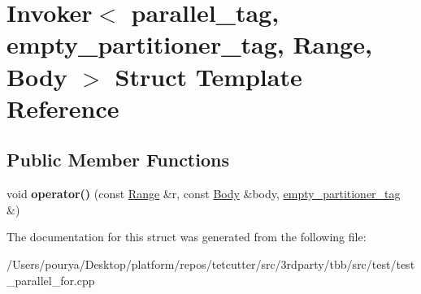 \hypertarget{structInvoker_3_01parallel__tag_00_01empty__partitioner__tag_00_01Range_00_01Body_01_4}{}\section{Invoker$<$ parallel\+\_\+tag, empty\+\_\+partitioner\+\_\+tag, Range, Body $>$ Struct Template Reference}
\label{structInvoker_3_01parallel__tag_00_01empty__partitioner__tag_00_01Range_00_01Body_01_4}
\subsection*{Public Member Functions}
\begin{DoxyCompactItemize}
\item 
\hypertarget{structInvoker_3_01parallel__tag_00_01empty__partitioner__tag_00_01Range_00_01Body_01_4_a876943ff4cbe8f4de0a47125411f743a}{}void {\bfseries operator()} (const \hyperlink{classtbb_1_1blocked__range}{Range} \&r, const \hyperlink{classBody}{Body} \&body, \hyperlink{structempty__partitioner__tag}{empty\+\_\+partitioner\+\_\+tag} \&)\label{structInvoker_3_01parallel__tag_00_01empty__partitioner__tag_00_01Range_00_01Body_01_4_a876943ff4cbe8f4de0a47125411f743a}

\end{DoxyCompactItemize}


The documentation for this struct was generated from the following file\+:\begin{DoxyCompactItemize}
\item 
/\+Users/pourya/\+Desktop/platform/repos/tetcutter/src/3rdparty/tbb/src/test/test\+\_\+parallel\+\_\+for.\+cpp\end{DoxyCompactItemize}
